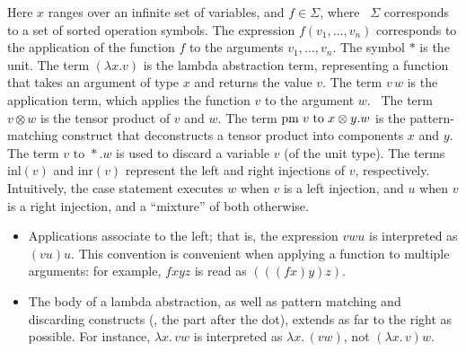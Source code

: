 Here $x$ ranges over an infinite set of variables, and $f \in \Sigma$, where  $\Sigma$ corresponds to a set of sorted operation symbols. The expression $f(v_1, \ldots, v_n)$ corresponds to the application of the function $f$ to the arguments $v_1, \ldots, v_n$. The symbol $*$ is the unit. The term $(\lambda x. v )$ is the lambda abstraction term, representing a function that takes an argument of type $x$ and returns the value $v$. The term $v \,w$ is the application term, which applies the function $v$ to the argument $w$.  The term $v \otimes w$ is the tensor product of $v$ and $w$. The term $\text{pm} \hspace{3 pt} v \hspace{3 pt} \text{to} \hspace{3 pt} x \otimes y. w$ is the pattern-matching construct that deconstructs a tensor product into components $x$ and $y$. The term $v \text{ to } *.w$ is used to discard a variable $v$ (of the unit type). The terms $\text{inl}(v)$ and $\text{inr}(v)$ represent the left and right injections of $v$, respectively. Intuitively, the case statement executes $w$ when $v$ is a left injection, and $u$ when $v$ is a right injection, and a ``mixture'' of both otherwise.

\begin{convention}
   \begin{itemize}
    \item Applications associate to the left; that is, the expression $vwu$ is interpreted as $(vu)u$. This convention is convenient when applying a function to multiple arguments: for example, $fxyz$ is read as $(((f x) y) z)$.
    \item The body of a lambda abstraction, as well as pattern matching and discarding constructs (\ie, the part after the dot), extends as far to the right as possible. For instance, $\lambda x.\,vw$ is interpreted as $\lambda x.\,(vw)$, not $(\lambda x.\,v)w$.
   \end{itemize}
\end{convention}







